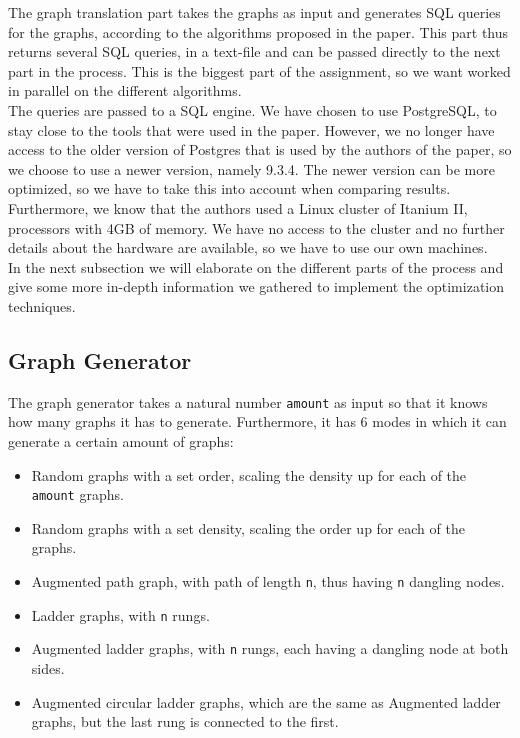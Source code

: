 The graph translation part takes the graphs as input and generates SQL queries for the graphs, according to the algorithms proposed in the paper. This part thus returns several SQL queries, in a text-file and can be passed directly to the next part in the process. This is the biggest part of the assignment, so we want worked in parallel on the different algorithms. \\

The queries are passed to a SQL engine. We have chosen to use PostgreSQL, to stay close to the tools that were used in the paper. However, we no longer have access to the older version of Postgres that is used by the authors of the paper, so we choose to use a newer version, namely 9.3.4. The newer version can be more optimized, so we have to take this into account when comparing results. Furthermore, we know that the authors used a Linux cluster of Itanium II, processors with 4GB of memory. We have no access to the cluster and no further details about the hardware are available, so we have to use our own machines.\\

In the next subsection we will elaborate on the different parts of the process and give some more in-depth information we gathered to implement the optimization techniques.

\subsection{Graph Generator}
The graph generator takes a natural number \texttt{amount} as input so that it knows how many graphs it has to generate. Furthermore, it has 6 modes in which it can generate a certain amount of graphs:

\begin{itemize}
	\item Random graphs with a set order, scaling the density up for each of the \texttt{amount} graphs.
	\item Random graphs with a set density, scaling the order up for each of the  graphs.
	\item Augmented path graph, with path of length \texttt{n}, thus having \texttt{n} dangling nodes.
	\item Ladder graphs, with \texttt{n} rungs.
	\item Augmented ladder graphs, with \texttt{n} rungs, each having a dangling node at both sides.
	\item Augmented circular ladder graphs, which are the same as Augmented ladder graphs, but the last rung is connected to the first.
\end{itemize}

